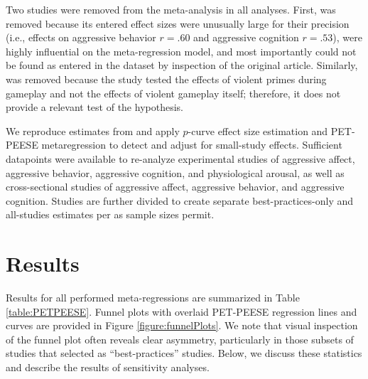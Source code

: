 \documentclass[man]{apa6}
\begin{document}
Two studies were removed from the meta-analysis in all analyses. First, \citet[study 1]{Matsuzaki:etal:2006} was removed because its entered effect sizes were unusually large for their precision (i.e., effects on aggressive behavior $r = .60$ and aggressive cognition $r = .53$), were highly influential on the meta-regression model, and most importantly could not be found as entered in the \citet{Anderson:etal:2010} dataset by inspection of the original article. %
Similarly, \citet{Panee:Ballard:2002} was removed because the study tested the effects of violent primes during gameplay and not the effects of violent gameplay itself; therefore, it does not provide a relevant test of the hypothesis. %

We reproduce estimates from \citet{Anderson:etal:2010} and apply $p$-curve effect size estimation and PET-PEESE metaregression to detect and adjust for small-study effects. Sufficient datapoints were available to re-analyze experimental studies of aggressive affect, aggressive behavior, aggressive cognition, and physiological arousal, as well as cross-sectional studies of aggressive affect, aggressive behavior, and aggressive cognition. Studies are further divided to create separate best-practices-only and all-studies estimates per \citet{Anderson:etal:2010} as sample sizes permit. 


\section{Results}
Results for all performed meta-regressions are summarized in Table \ref{table:PETPEESE}. 
Funnel plots with overlaid PET-PEESE regression lines and curves are provided in Figure \ref{figure:funnelPlots}. We note that visual inspection of the funnel plot often reveals clear asymmetry, particularly in those subsets of studies that \citet{Anderson:etal:2010} selected as ``best-practices'' studies.
Below, we discuss these statistics and describe the results of sensitivity analyses.
\end{document}
